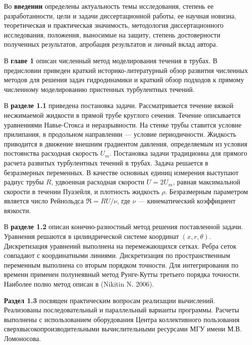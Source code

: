 Во \textbf{введении} определены актуальность темы исследования, степень ее разработанности, цели и задачи диссертационной работы, ее научная новизна, теоретическая и практическая значимость, методология диссертационного исследования, положения, выносимые на защиту, степень достоверности полученных результатов, апробация результатов и личный вклад автора. 

В {\bf главе 1} описан численный метод моделирования течения в трубах. 
В предисловии приведен краткий историко-литературный обзор развития численных методов для решения задач гидродинамики и краткий обзор подходов к прямому численному моделированию пристенных турбулентных течений. 

В \textbf{разделе 1.1} приведена постановка задачи. Рассматривается течение вязкой несжимаемой жидкости в прямой трубе круглого сечения. Течение описывается уравнениями Навье-Стокса и неразрывности. На стенке трубы ставится условие прилипания, в продольном направлении --- условие периодичности. Жидкость приводится в движение внешним градиентом давления, определяемым из условия постоянства расходная скорость $U_m$. Постановка задачи традиционна для прямого расчета развитых турбулентных течений в трубах. Задача решается в безразмерных переменных. В качестве основных единиц измерения выступают радиус трубы $R$, удвоенная расходная скорости $U = 2U_m$, равная максимальной скорости в течении Пуазейля, и плотность жидкость $\rho$. Безразмерным параметром является число Рейнольдса $\Re = RU/\nu$, где $\nu$ --- кинематический коэффициент вязкости.

В \textbf{разделе 1.2} описан конечно-разностный метод решения поставленной задачи. Уравнения решаются в цилиндрической системе координат $(x,r,\theta)$. Дискретизация уравнений выполнена на перемежающихся сетках. %
Ребра сеток совпадают с координатными линиями. Дискретизация по пространственным переменным выполнена со вторым порядком точности. Для интегрирования по времени применен полунеявный метод Рунге-Кутты третьего порядка точности. Наиболее полно метод описан в (Nikitin N. 2006).

\textbf{Раздел 1.3} посвящен практическим вопросам реализации вычислений. Реализованы последовательный и параллельный варианты программы. Расчеты выполнены с использованием оборудования Центра коллективного пользования сверхвысокопроизводительными вычислительными ресурсами МГУ имени М.В.\,Ломоносова. 

